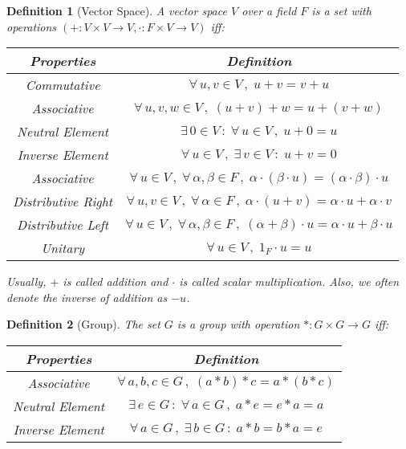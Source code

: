 \documentclass[12pt]{article}
\newcommand{\Forall}[1]{\forall\,{#1}\,,\;}
\newcommand{\Exist}[1]{\exists\,{#1}\,:\;}
\newtheorem{definition}{Definition}[subsection]
\begin{document}
\begin{definition}[Vector Space]
  A vector space $V$ over a field $F$ is a set with operations $(+:V\times V\to V,\cdot:F\times V\to V)$ iff:

  \begin{table}[H]
    \centering
    \begin{tabular}{|c|c|}\hline
      Properties & Definition \\\hline
      Commutative & $\Forall{u,v\in V}u+v=v+u$ \\\hline
      Associative & $\Forall{u,v,w\in V} (u+v)+w=u+(v+w)$ \\\hline
      Neutral Element & $\Exist{0 \in V}\Forall{u\in V} u+0=u$ \\\hline
      Inverse Element & $\Forall{u\in V}\Exist{v \in V}u+v=0$ \\\hline
      Associative & $\Forall{u \in V}\Forall{\alpha,\beta\in F}\alpha\cdot(\beta\cdot u)=(\alpha\cdot\beta)\cdot u$ \\\hline
      Distributive Right & $\Forall{u,v\in V}\Forall{\alpha\in F} \alpha\cdot(u+v)=\alpha\cdot u+\alpha\cdot v$ \\\hline
      Distributive Left & $\Forall{u\in V}\Forall{\alpha,\beta\in F} (\alpha+\beta)\cdot u=\alpha\cdot u+\beta\cdot u$ \\\hline
      Unitary & $\Forall{u\in V} 1_F\cdot u=u$ \\\hline
    \end{tabular}
  \end{table}

  Usually, $+$ is called addition and $\cdot$ is called scalar multiplication. Also, we often denote the inverse of addition as $-u$.
\end{definition}

\begin{definition}[Group]
  The set $G$ is a group with operation $*: G\times G\to G$ iff:
  \begin{table}[H]
    \centering
    \begin{tabular}{|c|c|}\hline
      Properties & Definition \\\hline
      Associative & $\Forall{a,b,c\in G} (a*b)*c=a*(b*c)$ \\\hline
      Neutral Element & $\Exist{e \in G}\Forall{a\in G} a*e=e*a=a$ \\\hline
      Inverse Element & $\Forall{a\in G}\Exist{b \in G}a*b=b*a=e$ \\\hline
    \end{tabular}
  \end{table}
\end{definition}
\end{document}
